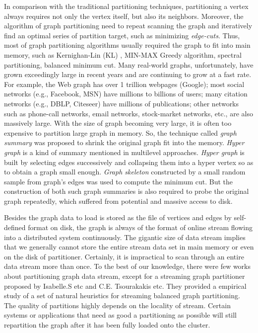 \documentclass{sig-alternate-2013}
\begin{document}
In comparison with the traditional partitioning techniques, partitioning a vertex always requires not only the vertex itself, but also its neighbors. Moreover, the algorithm of graph partitioning need to repeat scanning the graph and iteratively find an optimal series of partition target, such as minimizing \textit{edge-cuts}.
Thus, most of graph partitioning algorithms usually required the graph to fit into main memory, such as Kernighan-Lin (KL) \cite{Fiduccia:klvar, Kernighan:kl}, MIN-MAX Greedy algorithm\cite{Battiti:minmaxgreedy, Laguna:greedy}, spectral partitioning\cite{Luxburg:spectralcluster}, balanced minimum cut\cite{Karger:mincut}.
Many real-world graphs, unfortunately, have grown exceedingly large in recent years and are continuing to grow at a fast rate. For example, the Web graph has over 1 trillion webpages (Google); most social networks (e.g., Facebook, MSN) have millions to billions of users; many citation networks (e.g., DBLP, Citeseer) have millions of publications; other networks such as phone-call networks, email networks, stock-market networks, etc., are also massively large. With the size of graph becoming very large, it is often too expensive to partition large graph in memory.
So, the technique called \emph{graph summary} was proposed to shrink the original graph fit into the memory. \emph{Hyper graph} is a kind of summary mentioned in  multilevel approaches\cite{Lang:multilevel, Teng:multilevel, Dhillon:multilevel}. \emph{Hyper graph} is built by selecting edges successively and collapsing them into a hyper vertex so as to obtain a graph small enough. \emph{Graph skeleton} constructed by a small random sample from graph's edges\cite{Karger:mincut} was used to compute the minimum cut. But the construction of both such graph summaries is also required to probe the original graph repeatedly, which suffered from potential and massive access to disk.

Besides the graph data to load is stored as the file of vertices and edges by self-defined format on disk, the graph is always of the format of online stream flowing into a distributed system continuously. The gigantic size of data stream implies that we generally cannot store the entire stream data set in main memory or even on the disk of partitioner. Certainly, it is impractical to scan through an entire data stream more than once. To the best of our knowledge, there were few works about partitioning graph data stream, except for a streaming graph partitioner proposed by Isabelle.S etc\cite{Stanton:streampartition} and C.E. Tsourakakis etc\cite{Charalampos:fennel}. They provided a empirical study of a set of natural heuristics for streaming balanced graph partitioning. The quality of partitions highly depends on the locality of stream. Certain systems or applications that need as good a partitioning as possible will still repartition the graph after it has been fully loaded onto the cluster.
\end{document}
